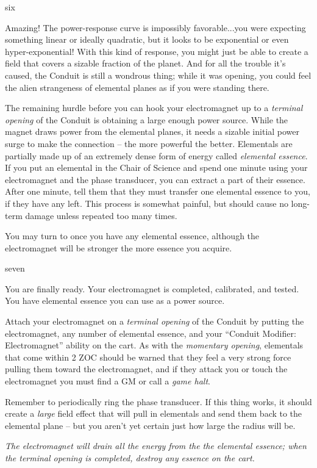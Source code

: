 \documentclass[notebook]{elementals}
\begin{document}
\begin{page}{six}

Amazing! The power-response curve is impossibly favorable...you were expecting something linear or ideally quadratic, but it looks to be exponential or even hyper-exponential! With this kind of response, you might just be able to create a field that covers a sizable fraction of the planet. And for all the trouble it's caused, the Conduit is still a wondrous thing; while it was opening, you could feel the alien strangeness of elemental planes as if you were standing there.

The remaining hurdle before you can hook your electromagnet up to a \emph{terminal opening} of the Conduit is obtaining a large enough power source. While the magnet draws power from the elemental planes, it needs a sizable initial power surge to make the connection -- the more powerful the better. Elementals are partially made up of an extremely dense form of energy called \emph{elemental essence}. If you put an elemental in the Chair of Science and spend one minute using your electromagnet and the phase transducer, you can extract a part of their essence. After one minute, tell them that they must transfer one elemental essence to you, if they have any left. This process is somewhat painful, but should cause no long-term damage unless repeated too many times.

You may turn to  once you have any elemental essence, although the electromagnet will be stronger the more essence you acquire.

\end{page}

\begin{page}{seven}

You are finally ready. Your electromagnet is completed, calibrated, and tested. You have elemental essence you can use as a power source.

Attach your electromagnet on a \emph{terminal opening} of the Conduit by putting the electromagnet, any number of elemental essence, and your ``Conduit Modifier: Electromagnet'' ability on the cart. As with the \emph{momentary opening}, elementals that come within 2 ZOC should be warned that they feel a very strong force pulling them toward the electromagnet, and if they attack you or touch the electromagnet you must find a GM or call a \emph{game halt}.

Remember to periodically ring the phase transducer. If this thing works, it should create a \emph{large} field effect that will pull in elementals and send them back to the elemental plane -- but you aren't yet certain just how large the radius will be.

\emph{The electromagnet will drain all the energy from the the elemental essence; when the terminal opening is completed, destroy any essence on the cart.}

\end{page}

\endnotebook
\end{document}
